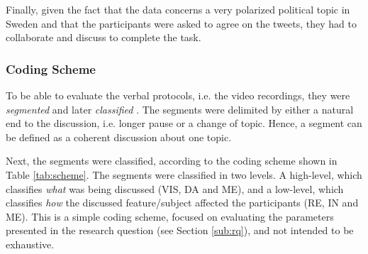 \documentclass{acmtog} %
\begin{document}
Finally, given the fact that the data concerns a very polarized political topic in Sweden and that the participants were asked to agree on the tweets, they had to collaborate and discuss to complete the task. 

\subsubsection{Coding Scheme}
\label{subsub:coding}
To be able to evaluate the verbal protocols, i.e. the video recordings, they were \emph{segmented} and later \emph{classified} \cite{someren1994think}. The segments were delimited by either a natural end to the discussion, i.e. longer pause or a change of topic. Hence, a segment can be defined as a coherent discussion about one topic. 

Next, the segments were classified, according to the coding scheme shown in Table \ref{tab:scheme}. The segments were classified in two levels. A high-level, which classifies \emph{what} was being discussed (VIS, DA and ME), and a low-level, which classifies \emph{how} the discussed feature/subject affected the participants (RE, IN and ME). This is a simple coding scheme, focused on evaluating the parameters presented in the research question (see Section \ref{sub:rq}), and not intended to be exhaustive.

\begin{table}[!ht]
\label{tab:scheme}
\end{table}
\end{document}
